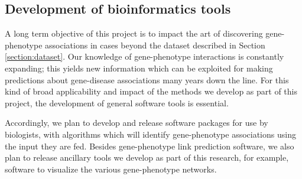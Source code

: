 \subsection{Development of bioinformatics tools}
A long term objective of this project is to impact the art of discovering gene-phenotype associations in cases beyond the dataset described in Section \ref{section:dataset}. Our knowledge of gene-phenotype interactions is constantly expanding; this yields new information which can be exploited for making predictions about gene-disease associations many years down the line. For this kind of broad applicability and impact of the methods we develop as part of this project, the development of general software tools is essential.

Accordingly, we plan to develop and release software packages for use by biologists, with algorithms which will identify gene-phenotype associations using the input they are fed. Besides gene-phenotype link prediction software, we also plan to release ancillary tools we develop as part of this research, for example, software to visualize the various gene-phenotype networks.
